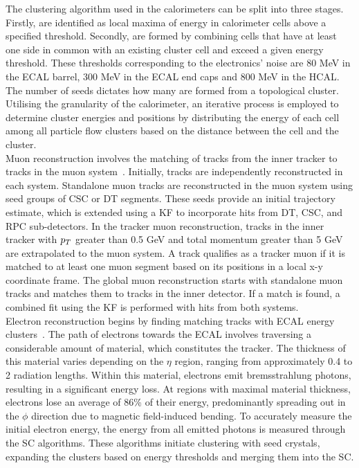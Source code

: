The clustering algorithm used in the calorimeters can be split into three stages. 
Firstly,  are identified as local maxima of energy in calorimeter cells above a specified threshold. 
Secondly,  are formed by combining cells that have at least one side in common with an existing cluster cell and exceed a given energy threshold. 
These thresholds corresponding to the electronics' noise are 80 MeV in the \ac{ECAL} barrel, 300 MeV in the \ac{ECAL} end caps and 800 MeV in the \ac{HCAL}. 
The number of seeds dictates how many  are formed from a topological cluster.
Utilising the granularity of the calorimeter, an iterative process is employed to determine cluster energies and positions by distributing the energy of each cell among all particle flow clusters based on the distance between the cell and the cluster. \\

Muon reconstruction involves the matching of tracks from the inner tracker to tracks in the muon system~\cite{CMS:2012nsv,CMS:2018rym}.
Initially, tracks are independently reconstructed in each system. 
Standalone muon tracks are reconstructed in the muon system using seed groups of \ac{CSC} or \ac{DT} segments. 
These seeds provide an initial trajectory estimate, which is extended using a \ac{KF} to incorporate hits from \ac{DT}, \ac{CSC}, and \ac{RPC} sub-detectors. 
In the tracker muon reconstruction, tracks in the inner tracker with $p_{T}$ greater than 0.5 GeV and total momentum greater than 5 GeV are extrapolated to the muon system. 
A track qualifies as a tracker muon if it is matched to at least one muon segment based on its positions in a local x-y coordinate frame. 
The global muon reconstruction starts with standalone muon tracks and matches them to tracks in the inner detector. 
If a match is found, a combined fit using the \ac{KF} is performed with hits from both systems. \\

Electron reconstruction begins by finding matching tracks with \ac{ECAL} energy clusters~\cite{CMS:2015xaf}.
The path of electrons towards the \ac{ECAL} involves traversing a considerable amount of material, which constitutes the tracker. 
The thickness of this material varies depending on the $\eta$ region, ranging from approximately 0.4 to 2 radiation lengths. 
Within this material, electrons emit bremsstrahlung photons, resulting in a significant energy loss. 
At regions with maximal material thickness, electrons lose an average of 86\% of their energy, predominantly spreading out in the $\phi$ direction due to magnetic field-induced bending. 
To accurately measure the initial electron energy, the energy from all emitted photons is measured through the \ac{SC} algorithms. 
These algorithms initiate clustering with seed crystals, expanding the clusters based on energy thresholds and merging them into the \ac{SC}. \\

